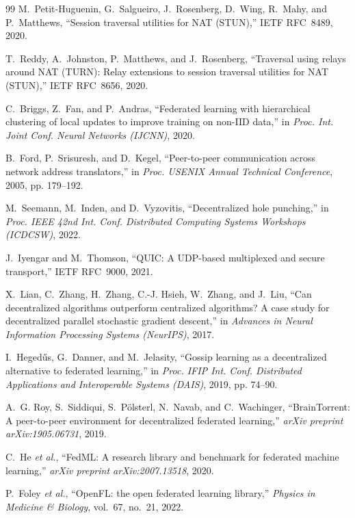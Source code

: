 \documentclass[journal]{IEEEtran}
\begin{document}
\begin{thebibliography}{99}
M.~Petit-Huguenin, G.~Salgueiro, J.~Rosenberg, D.~Wing, R.~Mahy, and P.~Matthews,
``Session traversal utilities for NAT (STUN),''
IETF RFC~8489, 2020.

T.~Reddy, A.~Johnston, P.~Matthews, and J.~Rosenberg,
``Traversal using relays around NAT (TURN): Relay extensions to session traversal utilities for NAT (STUN),''
IETF RFC~8656, 2020.

C.~Briggs, Z.~Fan, and P.~Andras,
``Federated learning with hierarchical clustering of local updates to improve training on non-IID data,''
in \emph{Proc. Int. Joint Conf. Neural Networks (IJCNN)}, 2020.

B.~Ford, P.~Srisuresh, and D.~Kegel,
``Peer-to-peer communication across network address translators,''
in \emph{Proc. USENIX Annual Technical Conference}, 2005, pp. 179--192.

M.~Seemann, M.~Inden, and D.~Vyzovitis,
``Decentralized hole punching,''
in \emph{Proc. IEEE 42nd Int. Conf. Distributed Computing Systems Workshops (ICDCSW)}, 2022.

J.~Iyengar and M.~Thomson,
``QUIC: A UDP-based multiplexed and secure transport,''
IETF RFC~9000, 2021.

X.~Lian, C.~Zhang, H.~Zhang, C.-J. Hsieh, W.~Zhang, and J.~Liu,
``Can decentralized algorithms outperform centralized algorithms? A case study for decentralized parallel stochastic gradient descent,''
in \emph{Advances in Neural Information Processing Systems (NeurIPS)}, 2017.

I.~Heged\H{u}s, G.~Danner, and M.~Jelasity,
``Gossip learning as a decentralized alternative to federated learning,''
in \emph{Proc. IFIP Int. Conf. Distributed Applications and Interoperable Systems (DAIS)}, 2019, pp. 74--90.

A.~G. Roy, S.~Siddiqui, S.~P\"olsterl, N.~Navab, and C.~Wachinger,
``BrainTorrent: A peer-to-peer environment for decentralized federated learning,''
\emph{arXiv preprint arXiv:1905.06731}, 2019.

C.~He \emph{et al.},
``FedML: A research library and benchmark for federated machine learning,''
\emph{arXiv preprint arXiv:2007.13518}, 2020.

P.~Foley \emph{et al.},
``OpenFL: the open federated learning library,''
\emph{Physics in Medicine \& Biology}, vol.~67, no.~21, 2022.


\end{thebibliography}
\end{document}
